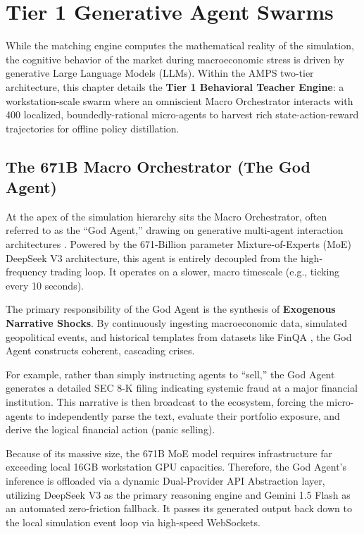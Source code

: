 \chapter{Tier 1 Generative Agent Swarms}
\label{ch:generative_agent_swarms}
\label{ch:generative_swarms}

While the matching engine computes the mathematical reality of the simulation, the cognitive behavior of the market during macroeconomic stress is driven by generative Large Language Models (LLMs). Within the AMPS two-tier architecture, this chapter details the \textbf{Tier 1 Behavioral Teacher Engine}: a workstation-scale swarm where an omniscient Macro Orchestrator interacts with 400 localized, boundedly-rational micro-agents to harvest rich state-action-reward trajectories for offline policy distillation.

\section{The 671B Macro Orchestrator (The God Agent)}

At the apex of the simulation hierarchy sits the Macro Orchestrator, often referred to as the ``God Agent,'' drawing on generative multi-agent interaction architectures \cite{park2023generative}. Powered by the 671-Billion parameter Mixture-of-Experts (MoE) DeepSeek V3 architecture, this agent is entirely decoupled from the high-frequency trading loop. It operates on a slower, macro timescale (e.g., ticking every 10 seconds).

The primary responsibility of the God Agent is the synthesis of \textbf{Exogenous Narrative Shocks}. By continuously ingesting macroeconomic data, simulated geopolitical events, and historical templates from datasets like FinQA \cite{chen2021finqa}, the God Agent constructs coherent, cascading crises. 

For example, rather than simply instructing agents to ``sell,'' the God Agent generates a detailed SEC 8-K filing indicating systemic fraud at a major financial institution. This narrative is then broadcast to the ecosystem, forcing the micro-agents to independently parse the text, evaluate their portfolio exposure, and derive the logical financial action (panic selling).

Because of its massive size, the 671B MoE model requires infrastructure far exceeding local 16GB workstation GPU capacities. Therefore, the God Agent's inference is offloaded via a dynamic Dual-Provider API Abstraction layer, utilizing DeepSeek V3 as the primary reasoning engine and Gemini 1.5 Flash as an automated zero-friction fallback. It passes its generated output back down to the local simulation event loop via high-speed WebSockets.

